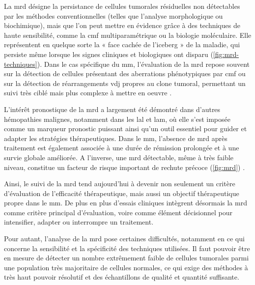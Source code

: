 \vspace{1em}


La \gls{mrd} désigne la persistance de cellules tumorales résiduelles non
détectables par les méthodes conventionnelles (telles que l'analyse
morphologique ou biochimique), mais que l'on peut mettre en évidence grâce à
des techniques de haute sensibilité, comme la \gls{cmf} multiparamétrique ou la
biologie moléculaire. Elle représentent en quelque sorte la « face cachée de
l'iceberg » de la maladie, qui persiste même lorsque les signes cliniques et
biologiques ont disparu (\autoref{fig:mrd-techniques}). Dans le cas spécifique
du \gls{mm}, l'évaluation de la \gls{mrd} repose souvent sur la détection de
cellules présentant des aberrations phénotypiques par \gls{cmf} ou sur la
détection de réarrangements \gls{vdj} propres au clone tumoral, permettant un
suivi très ciblé mais plus complexe à mettre en oeuvre
\cite{bertaminiMRDAssessmentMultiple2021}.



L'intérêt pronostique de la \gls{mrd} a largement été démontré dans d'autres
hémopathies malignes, notamment dans les \gls{lal} et \gls{lam}, où elle s'est
imposée comme un marqueur pronostic puissant ainsi qu'un outil essentiel pour
guider et adapter les stratégies thérapeutiques. Dans le \gls{mm}, l'absence de
\gls{mrd} après traitement est également associée à une durée de rémission
prolongée et à une survie globale améliorée. A l'inverse, une \gls{mrd}
détectable, même à très faible niveau, constitue un facteur de risque important
de rechute précoce (\autoref{fig:mrd})
\cite{munshiLargeMetaanalysisEstablishes2020}.

\vspace{1em}

Ainsi, le suivi de la \gls{mrd} tend aujourd'hui à devenir non seulement un
critère d'évaluation de l'efficacité thérapeutique, mais aussi un objectif
thérapeutique propre dans le \gls{mm}. De plus en plus d'essais cliniques
intègrent désormais la \gls{mrd} comme critère principal d'évaluation, voire
comme élément décisionnel pour intensifier, adapter ou interrompre un
traitement.



Pour autant, l'analyse de la \gls{mrd} pose certaines difficultés, notamment en
ce qui concerne la sensibilité et la spécificité des techniques utilisées. Il
faut pouvoir être en mesure de détecter un nombre extrêmement faible de
cellules tumorales parmi une population très majoritaire de cellules normales,
ce qui exige des méthodes à très haut pouvoir résolutif et des échantillons de
qualité et quantité suffisante.

